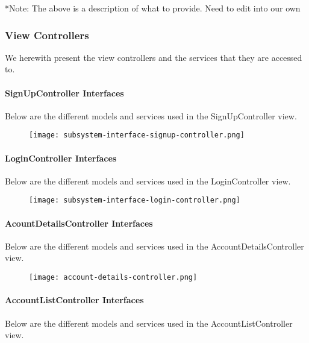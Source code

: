 \documentclass[12pt]{article}
\begin{document}
*Note: The above is a description of what to provide. Need to edit into our own
\subsubsection{View Controllers}

We herewith present the view controllers and the services that they are accessed to.
\paragraph{SignUpController Interfaces}

Below are the different models and services used in the SignUpController view.

\begin{figure}[H]
\texttt{[image: subsystem-interface-signup-controller.png]}
\end{figure}

\clearpage

\paragraph{LoginController Interfaces}

Below are the different models and services used in the LoginController view.

\begin{figure}[H]
\texttt{[image: subsystem-interface-login-controller.png]}
\end{figure}

\clearpage

\paragraph{AcountDetailsController Interfaces}

Below are the different models and services used in the AccountDetailsController view.

\begin{figure}[H]
\texttt{[image: account-details-controller.png]}
\end{figure}

\clearpage

\paragraph{AccountListController Interfaces}

Below are the different models and services used in the AccountListController view.
\end{document}
